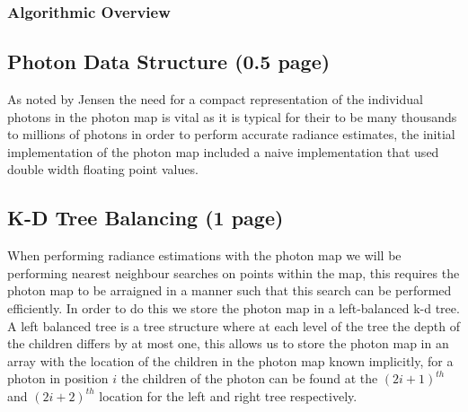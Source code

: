 \subsubsection{Algorithmic Overview}
%
%
%	

\subsection{Photon Data Structure (0.5 page)}
As noted by Jensen  the need for a compact representation of the individual photons in the photon map is vital
as it is typical for their to be many thousands to millions of photons in order to perform accurate radiance estimates,
the initial implementation of the photon map included a naive implementation that used double width floating point values.

\subsection{K-D Tree Balancing (1 page)}
When performing radiance estimations with the photon map we will be performing nearest neighbour searches on points within
the map, this requires the photon map to be arraigned in a manner such that this search can be performed efficiently.
In order to do this we store the photon map in a left-balanced k-d tree. A left balanced tree is a tree structure where
at each level of the tree the depth of the children differs by at most one, 
this allows us to store the photon map in an array with the location of the children in the photon map known implicitly,
for a photon in position $i$ the children of the photon can be found at the $(2i + 1)^{th}$ and $(2i + 2)^{th}$
location for the left and right tree respectively.


